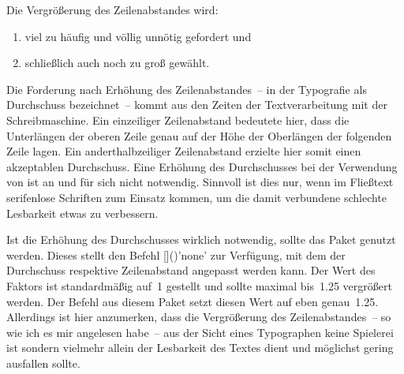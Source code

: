 \begin{DeclarePackages}[Typografie]
  Die Vergrößerung des Zeilenabstandes wird:
  \begin{enumerate}[itemindent=0pt,labelwidth=*,labelsep=1em,label=\Roman*.]
  \item viel zu häufig und völlig unnötig gefordert und
  \item schließlich auch noch zu groß gewählt.
  \end{enumerate}
  Die Forderung nach Erhöhung des Zeilenabstandes~-- in der Typografie als 
  Durchschuss bezeichnet~-- kommt aus den Zeiten der Textverarbeitung mit der 
  Schreibmaschine. Ein einzeiliger Zeilenabstand bedeutete hier, dass die 
  Unterlängen der oberen Zeile genau auf der Höhe der Oberlängen der folgenden 
  Zeile lagen. Ein anderthalbzeiliger Zeilenabstand erzielte hier somit einen 
  akzeptablen Durchschuss. Eine Erhöhung des Durchschusses bei der Verwendung 
  von  ist an und für sich nicht notwendig. Sinnvoll ist dies 
  nur, wenn im Fließtext serifenlose Schriften zum Einsatz kommen, um die damit 
  verbundene schlechte Lesbarkeit etwas zu verbessern.
  
  Ist die Erhöhung des Durchschusses wirklich notwendig, sollte das Paket 
   genutzt werden. Dieses stellt den Befehl 
  []()'none' zur 
  Verfügung, mit dem der Durchschuss respektive Zeilenabstand angepasst werden 
  kann. Der Wert des Faktors ist standardmäßig auf~1 gestellt und sollte 
  maximal bis~1.25 vergrößert werden. Der Befehl  aus 
  diesem Paket setzt diesen Wert auf eben genau~1.25. Allerdings ist hier 
  anzumerken, dass die Vergrößerung des Zeilenabstandes~-- so wie ich es mir 
  angelesen habe~-- aus der Sicht eines Typographen keine Spielerei ist sondern 
  vielmehr allein der Lesbarkeit des Textes dient und möglichst gering 
  ausfallen sollte.
  

\end{DeclarePackages}
